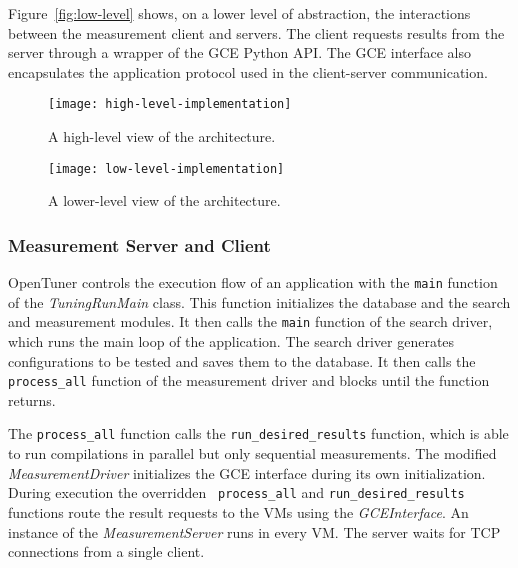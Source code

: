 Figure~\ref{fig:low-level} shows, on a lower level of abstraction, the
interactions between the measurement client and servers. The client requests
results from the server through a wrapper of the GCE Python API.  The GCE
interface also encapsulates the application protocol used in the client-server
communication.

\begin{figure}[htpb]
    \centering
    \begin{minipage}{.45\textwidth}
        \centering
        \texttt{[image: high-level-implementation]}
        \caption{A high-level view of the architecture.}
        \label{fig:high-level}
    \end{minipage}%
    \hfill
    \begin{minipage}{.45\textwidth}
        \centering
        \texttt{[image: low-level-implementation]}
        \caption{A lower-level view of the architecture.}
        \label{fig:low-level}
    \end{minipage}%
    \label{fig:archs}
\end{figure}

\subsubsection{Measurement Server and Client}
\label{sec:server-client}

OpenTuner controls the execution flow of an application with the
\texttt{\footnotesize main} function of the \emph{TuningRunMain} class. This
function initializes the database and the search and measurement modules. It
then calls the \texttt{\footnotesize main} function of the search driver, which
runs the main loop of the application.  The search driver generates
configurations to be tested and saves them to the database. It then calls the
\texttt{\footnotesize process\_all} function of the measurement driver and
blocks until the function returns.

The \texttt{\footnotesize process\_all} function calls the
\texttt{\footnotesize run\_desired\_results} function, which is able to run
compilations in parallel but only sequential measurements.  The modified
\emph{MeasurementDriver} initializes the GCE interface during its own
initialization. During execution the overridden \texttt{\footnotesize
process\_all} and \texttt{\footnotesize run\_desired\_results} functions route
the result requests to the VMs using the \emph{GCEInterface}.  An instance of
the \emph{MeasurementServer} runs in every VM. The server waits for TCP
connections from a single client.

